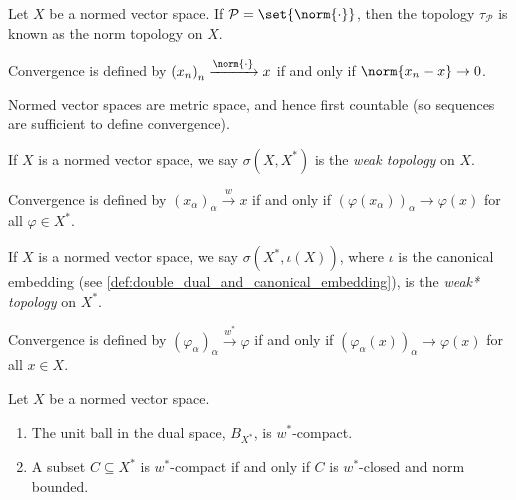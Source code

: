\begin{definition}\label{def:norm_topology}
  Let $X$ be a normed vector space. If $\mathcal{P} = \set{\norm{\cdot}}$, then the topology $\tau_{\mathcal{P}}$ is known as the norm topology on $X$.\newline

  Convergence is defined by $\left(x_n\right)_n\xrightarrow{\norm{\cdot}}x$ if and only if $\norm{x_n - x}\rightarrow 0$.
\end{definition}
\begin{remark}
  Normed vector spaces are metric space, and hence first countable (so sequences are sufficient to define convergence).
\end{remark}
\begin{definition}\label{def:weak_topology}
  If $X$ is a normed vector space, we say $\sigma\left(X,X^{\ast}\right)$ is the \textit{weak topology} on $X$.\newline

  Convergence is defined by $\left(x_\alpha\right)_\alpha\xrightarrow{w}x$ if and only if $\left(\varphi\left(x_\alpha\right)\right)_\alpha\rightarrow \varphi\left(x\right)$ for all $\varphi\in X^{\ast}$.
\end{definition}
\begin{definition}\label{def:weak_star_topology}
  If $X$ is a normed vector space, we say $\sigma\left(X^{\ast},\iota(X)\right)$, where $\iota$ is the canonical embedding (see \ref{def:double_dual_and_canonical_embedding}), is the \textit{weak* topology} on $X^{\ast}$.\newline

  Convergence is defined by $\left(\varphi_{\alpha}\right)_\alpha\xrightarrow{w^{\ast}} \varphi$ if and only if $\left(\varphi_{\alpha}(x)\right)_{\alpha}\rightarrow \varphi(x)$ for all $x\in X$.
\end{definition}
\begin{theorem}\label{thm:banach_alaoglu}
  Let $X$ be a normed vector space. 
  \begin{enumerate}[(1)]
    \item The unit ball in the dual space, $B_{X^{\ast}}$, is $w^{\ast}$-compact.
    \item A subset $C\subseteq X^{\ast}$ is $w^{\ast}$-compact if and only if $C$ is $w^{\ast}$-closed and norm bounded.
  \end{enumerate}
\end{theorem}
